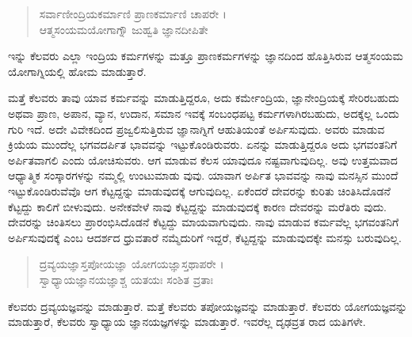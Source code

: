\begin{verse}
ಸರ್ವಾಣೀಂದ್ರಿಯಕರ್ಮಾಣಿ ಪ್ರಾಣಕರ್ಮಾಣಿ ಚಾಪರೇ ।\\ಆತ್ಮಸಂಯಮಯೋಗಾಗ್ನೌ ಜುಹ್ವತಿ ಜ್ಞಾನದೀಪಿತೇ 
\end{verse}

{\small ಇನ್ನು ಕೆಲವರು ಎಲ್ಲಾ ಇಂದ್ರಿಯ ಕರ್ಮಗಳನ್ನು ಮತ್ತೂ ಪ್ರಾಣಕರ್ಮಗಳನ್ನು ಜ್ಞಾನದಿಂದ ಹೊತ್ತಿಸಿರುವ ಆತ್ಮಸಂಯಮ ಯೋಗಾಗ್ನಿಯಲ್ಲಿ ಹೋಮ ಮಾಡುತ್ತಾರೆ.}

ಮತ್ತೆ ಕೆಲವರು ತಾವು ಯಾವ ಕರ್ಮವನ್ನು ಮಾಡುತ್ತಿದ್ದರೂ, ಅದು ಕರ್ಮೇಂದ್ರಿಯ, ಜ್ಞಾನೇಂದ್ರಿಯಕ್ಕೆ ಸೇರಿರಬಹುದು ಅಥವಾ ಪ್ರಾಣ, ಅಪಾನ, ವ್ಯಾನ, ಉದಾನ, ಸಮಾನ ಇವಕ್ಕೆ ಸಂಬಂಧಪಟ್ಟ ಕರ್ಮಗಳಾಗಿರಬಹುದು, ಅದಕ್ಕೆಲ್ಲ ಒಂದು ಗುರಿ ಇದೆ. ಅದೇ ವಿವೇಕದಿಂದ ಪ್ರಜ್ವಲಿಸುತ್ತಿರುವ ಜ್ಞಾನಾಗ್ನಿಗೆ ಆಹುತಿಯಂತೆ ಅರ್ಪಿಸುವುದು. ಅವರು ಮಾಡುವ ಕ್ರಿಯೆಯ ಮುಂದೆಲ್ಲ ಭಗವದರ್ಪಿತ ಭಾವವನ್ನು ಇಟ್ಟುಕೊಂಡಿರುವರು. ಏನನ್ನು ಮಾಡುತ್ತಿದ್ದರೂ ಅದು ಭಗವಂತನಿಗೆ ಅರ್ಪಿತವಾಗಲಿ ಎಂದು ಯೋಚಿಸುವರು. ಆಗ ಮಾಡುವ ಕೆಲಸ ಯಾವುದೂ ನಷ್ಟವಾಗುವುದಿಲ್ಲ. ಅವು ಉತ್ತಮವಾದ ಆಧ್ಯಾತ್ಮಿಕ ಸಂಸ್ಕಾರಗಳನ್ನು ನಮ್ಮಲ್ಲಿ ಉಂಟುಮಾಡು ವುವು. ಯಾವಾಗ ಅರ್ಪಿತ ಭಾವವನ್ನು ನಾವು ಮನಸ್ಸಿನ ಮುಂದೆ ಇಟ್ಟುಕೊಂಡಿರುವೆವೊ ಆಗ ಕೆಟ್ಟದ್ದನ್ನು ಮಾಡುವುದಕ್ಕೆ ಆಗುವುದಿಲ್ಲ. ಏಕೆಂದರೆ ದೇವರನ್ನು ಕುರಿತು ಚಿಂತಿಸಿದೊಡನೆ ಕೆಟ್ಟದ್ದು ಕಾಲಿಗೆ ಬೀಳುವುದು. ಅನೇಕವೇಳೆ ನಾವು ಕೆಟ್ಟದ್ದನ್ನು ಮಾಡುವುದಕ್ಕೆ ಕಾರಣ ದೇವರನ್ನು ಮರೆತಿರು ವುದು. ದೇವರನ್ನು ಚಿಂತಿಸಲು ಪ್ರಾರಂಭಿಸಿದೊಡನೆ ಕೆಟ್ಟದ್ದು ಮಾಯವಾಗುವುದು. ನಾವು ಮಾಡುವ ಕರ್ಮವೆಲ್ಲ ಭಗವಂತನಿಗೆ ಅರ್ಪಿಸುವುದಕ್ಕೆ ಎಂಬ ಆದರ್ಶದ ಧ್ರುವತಾರೆ ನಮ್ಮೆದುರಿಗೆ ಇದ್ದರೆ, ಕೆಟ್ಟದ್ದನ್ನು ಮಾಡುವುದಕ್ಕೇ ಮನಸ್ಸು ಬರುವುದಿಲ್ಲ.

\begin{verse}
ದ್ರವ್ಯಯಜ್ಞಾಸ್ತಪೋಯಜ್ಞಾ ಯೋಗಯಜ್ಞಾಸ್ತಥಾಪರೇ ।\\ಸ್ವಾಧ್ಯಾಯಜ್ಞಾನಯಜ್ಞಾಶ್ಚ ಯತಯಃ ಸಂಶಿತ ವ್ರತಾಃ 
\end{verse}

{\small ಕೆಲವರು ದ್ರವ್ಯಯಜ್ಞವನ್ನು ಮಾಡುತ್ತಾರೆ. ಮತ್ತೆ ಕೆಲವರು ತಪೋಯಜ್ಞವನ್ನು ಮಾಡುತ್ತಾರೆ. ಕೆಲವರು ಯೋಗಯಜ್ಞವನ್ನು ಮಾಡುತ್ತಾರೆ, ಕೆಲವರು ಸ್ವಾಧ್ಯಾಯ ಜ್ಞಾನಯಜ್ಞಗಳನ್ನು ಮಾಡುತ್ತಾರೆ. ಇವರೆಲ್ಲ ದೃಢವ್ರತ ರಾದ ಯತಿಗಳೇ.}

